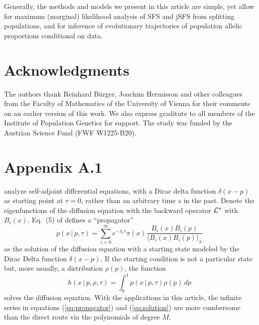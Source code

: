 \documentclass[preprint]{elsarticle}
\newcommand\given{{\,|\,}}
\newcommand\eg{{\it e.g.,}}
\begin{document}
Generally, the methods and models we present in this article are simple, yet allow for maximum (marginal) likelihood analysis of SFS and jSFS from splitting populations, and for inference of evolutionary trajectories of population allelic proportions conditional on data. 

\section*{Acknowledgments}

The authors thank Reinhard B\"urger, Joachim Hermisson and other colleagues from the Faculty of Mathematics of the University of Vienna for their comments on an earlier version of this work. We also express graditute to all members of the Institute of Population Genetics for support. The study was funded by the Austrian Science Fund (FWF W1225-B20). %

\section{Appendix A.1}\label{section:Greens_function}

\citet{Song12} analyze self-adjoint differential equations, with a Dirac delta function $\delta(x-p)$ as starting point at $\tau=0$, rather than an arbitrary time $s$ in the past. Denote the eigenfunctions of the diffusion equation with the backward operator $\cal{L}^*$ with $B_i(x)$. Eq.~(5) of \citet{Song12} defines a ``propagator'' \citep[][chap.~19]{Bayi06}
\begin{equation}\label{eq:propagator}
    p(x\given p,\tau)=\sum_{i=0}^\infty e^{-\lambda_i \tau}\pi(x) \frac{B_i(x)B_i(p)}{\langle B_i(x)B_i(p) \rangle_{\pi}}
\end{equation}
as the solution of the diffusion equation with a starting state modeled by the Dirac Delta function $\delta(x-p)$. If the starting condition is not a particular state but, more usually, a distribution $\rho(p)$, the function
\begin{equation}\label{eq:solution}
    h(x\given p,\rho,\tau)=\int_0^1 p(x\given p,\tau)\rho(p)\,dp
\end{equation}
solves the diffusion equation. With the applications in this article, the infinite series in equations (\ref{eq:propagator}) and (\ref{eq:solution}) are more cumbersome than the direct route via the polynomials of degree $M$. 

\end{document}
